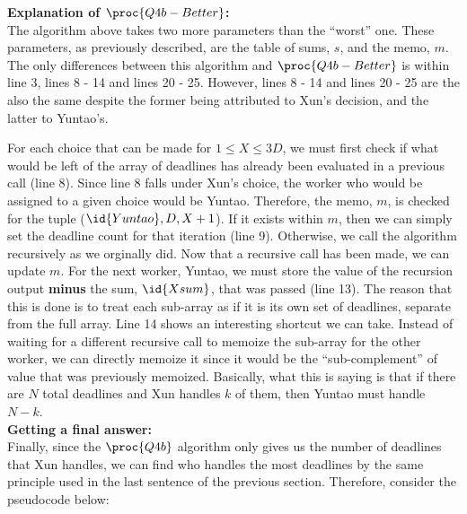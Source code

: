     \vspace{5mm}
    \textbf{Explanation of $\proc{Q4b-Better}$:}\\
    The algorithm above takes two more parameters than the ``worst'' one.
    These parameters, as previously described, are the table of sums, $s$, and the memo, $m$.
    The only differences between this algorithm and $\proc{Q4b-Better}$ is within line 3, lines 8 - 14 and lines 20 - 25.
    However, lines 8 - 14 and lines 20 - 25 are the also the same despite the former being attributed to Xun's decision, and the latter to Yuntao's.

    For each choice that can be made for $1 \le X \le 3D$, we must first check if what would be left of the array of deadlines has already been evaluated in a previous call (line 8).
    Since line 8 falls under Xun's choice, the worker who would be assigned to a given choice would be Yuntao.
    Therefore, the memo, $m$, is checked for the tuple ($\id{Yuntao}, D, X + 1$).
    If it exists within $m$, then we can simply set the deadline count for that iteration (line 9).
    Otherwise, we call the algorithm recursively as we orginally did.
    Now that a recursive call has been made, we can update $m$.
    For the next worker, Yuntao, we must store the value of the recursion output \textbf{minus} the sum, $\id{Xsum}$, that was passed (line 13).
    The reason that this is done is to treat each sub-array as if it is its own set of deadlines, separate from the full array.
    Line 14 shows an interesting shortcut we can take.
    Instead of waiting for a different recursive call to memoize the sub-array for the other worker, we can directly memoize it since it would be the ``sub-complement'' of value that was previously memoized.
    Basically, what this is saying is that if there are $N$ total deadlines and Xun handles $k$ of them, then Yuntao must handle $N - k$. \\

    \textbf{Getting a final answer:}\\
    Finally, since the $\proc{Q4b}$ algorithm only gives us the number of deadlines that Xun handles, we can find who handles the most deadlines by the same principle used in the last sentence of the previous section.
    Therefore, consider the pseudocode below:

